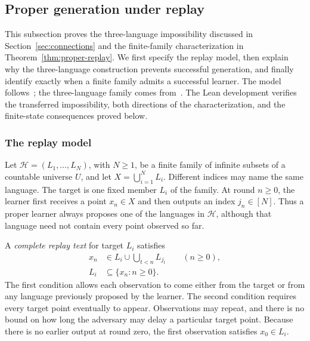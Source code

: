 \subsection{Proper generation under replay}
\label{app:replay}
\newcommand{\replayset}[1]{\{#1\}}

This subsection proves the three-language impossibility discussed in
Section~\ref{sec:connections} and the finite-family characterization in
Theorem~\ref{thm:proper-replay}. We first specify the replay model, then
explain why the three-language construction prevents successful generation,
and finally identify exactly when a finite family admits a successful
learner. The model follows~\citet[][P22]{replay}; the three-language family
comes from~\citet[][P31]{memory}. The Lean development verifies the transferred
impossibility, both directions of the characterization, and the finite-state
consequences proved below.

\subsubsection{The replay model}

Let $\mathcal H=(L_1,\ldots,L_N)$, with $N\ge1$, be a finite family of
infinite subsets of a countable universe $U$, and let
$X=\bigcup_{i=1}^N L_i$. Different indices may name the same language.
The target is one fixed member $L_i$ of the family. At round $n\ge0$,
the learner first receives a point $x_n\in X$ and then outputs an index
$j_n\in[N]$. Thus a proper learner always proposes one of the languages
in $\mathcal H$, although that language need not contain every point
observed so far.

A \emph{complete replay text} for target $L_i$ satisfies
\begin{align}
 x_n&\in L_i\cup\bigcup_{t<n}L_{j_t}
       \qquad(n\ge0),\label{app:replay:eq:legal}\\
 L_i&\subseteq\replayset{x_n:n\ge0}.\label{app:replay:eq:full}
\end{align}
The first condition allows each observation to come either from the target
or from any language previously proposed by the learner. The second
condition requires every target point eventually to appear. Observations
may repeat, and there is no bound on how long the adversary may delay a
particular target point. Because there is no earlier output at round zero,
the first observation satisfies $x_0\in L_i$.

